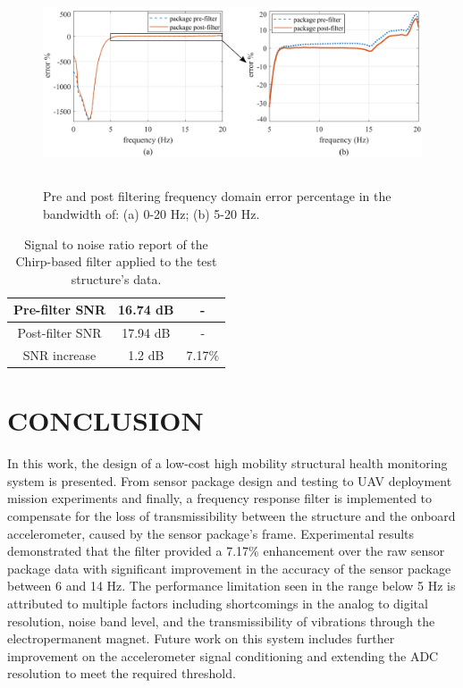 \documentclass[]{spie}  %
\begin{document}
	\begin{figure} [H]
		\centering
		\includegraphics[height=6cm]{figures/Chirp Structure Error.png}
		\caption{Pre and post filtering frequency domain error percentage in the bandwidth of: (a) 0-20 Hz; (b) 5-20 Hz.}
		\label{fig:chirp structure error} 	
	\end{figure} 

	\begin{table}[H]
	\caption{Signal to noise ratio report of the Chirp-based filter applied to the test structure’s data.} 
	\label{tab:SNR Report}
	\begin{center}       
		\begin{tabular}{|c|c|c|} 
			\hline
			\rule[-1ex]{0pt}{3.5ex}  Pre-filter SNR & 16.74 dB & - \\
			\hline
			\rule[-1ex]{0pt}{3.5ex}  Post-filter SNR & 17.94 dB & - \\
			\hline
			\rule[-1ex]{0pt}{3.5ex}  SNR increase & 1.2 dB & 7.17\% \\
			\hline
		\end{tabular}
	\end{center}
	\end{table}
	
	\section{CONCLUSION}
	In this work, the design of a low-cost high mobility structural health monitoring system is presented. From sensor package design and testing to UAV deployment mission experiments and finally, a frequency response filter is implemented to compensate for the loss of transmissibility between the structure and the onboard accelerometer, caused by the sensor package's frame. Experimental results demonstrated that the filter provided a 7.17\% enhancement over the raw sensor package data with significant improvement in the accuracy of the sensor package between 6 and 14 Hz. The performance limitation seen in the range below 5 Hz is attributed to multiple factors including shortcomings in the analog to digital resolution, noise band level, and the transmissibility of vibrations through the electropermanent magnet. Future work on this system includes further improvement on the accelerometer signal conditioning and extending the ADC resolution to meet the required threshold.  
	
\end{document}
